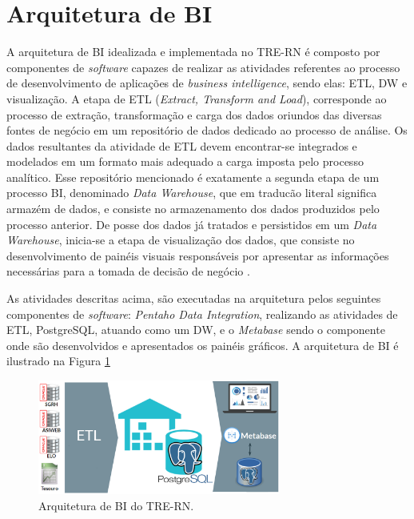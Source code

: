 \section{Arquitetura de BI}
A arquitetura de BI idealizada e implementada no TRE-RN é composto por componentes de \textit{software} capazes de realizar as atividades referentes ao processo de desenvolvimento de aplicações de \textit{business intelligence}, sendo elas: ETL, DW e visualização.
A etapa de ETL (\textit{Extract, Transform and Load}), corresponde ao processo de extração, transformação e carga dos dados oriundos das diversas fontes de negócio em um repositório de dados dedicado ao processo de análise. Os dados resultantes da atividade de ETL devem encontrar-se integrados e modelados em um formato mais adequado a carga imposta pelo processo analítico. 
Esse repositório mencionado é exatamente a segunda etapa de um processo BI, denominado \textit{Data Warehouse}, que em traducão literal significa armazém de dados, e consiste no armazenamento dos dados produzidos pelo processo anterior.
De posse dos dados já tratados e persistidos em um \textit{Data Warehouse}, inicia-se a etapa de visualização dos dados, que consiste no desenvolvimento de painéis visuais responsáveis por apresentar as informações necessárias para a tomada de decisão de negócio \cite{BIProcess}.

As atividades descritas acima, são executadas na arquitetura pelos seguintes componentes de \textit{software}: \textit{Pentaho Data Integration}, realizando as atividades de ETL, PostgreSQL, atuando como um DW, e o \textit{Metabase} sendo o componente onde são desenvolvidos e apresentados os painéis gráficos. A arquitetura de BI é ilustrado na Figura \ref{fig:modelo_referencia}

\begin{figure}[htp]
   \centering
    \includegraphics[width=8cm]{Imagens/Arq_TRE}
    \caption{Arquitetura de BI do TRE-RN.}
    \label{fig:modelo_referencia}
\end{figure} 

